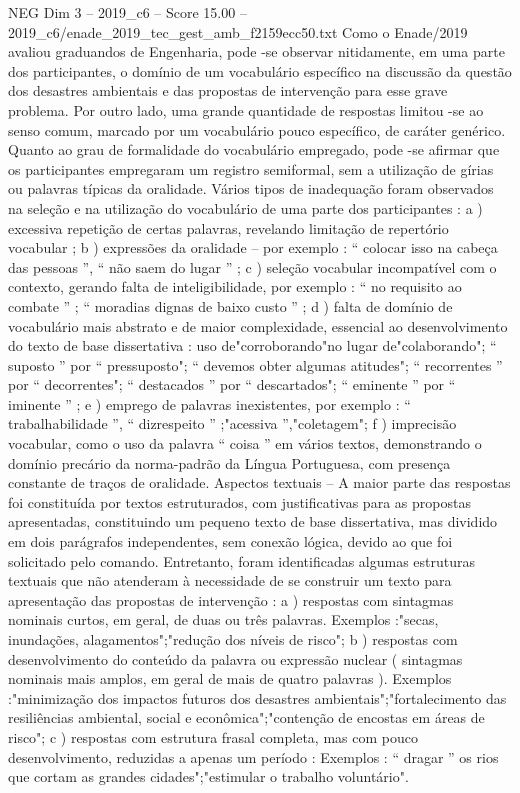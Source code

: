 \begin{textsample}{NEG Dim 3 – 2019\_c6 – Score 15.00 – 2019\_c6/enade\_2019\_tec\_gest\_amb\_f2159ecc50.txt}
Como o Enade/2019 avaliou graduandos de Engenharia, pode -se observar nitidamente, em uma parte dos participantes, o domínio de um vocabulário específico na discussão da questão dos desastres ambientais e das propostas de intervenção para esse grave problema.
Por outro lado, uma grande quantidade de respostas limitou -se ao senso comum, marcado por um vocabulário pouco específico, de caráter genérico.
Quanto ao grau de formalidade do vocabulário empregado, pode -se afirmar que os participantes empregaram um registro semiformal, sem a utilização de gírias ou palavras típicas da oralidade.
Vários tipos de inadequação foram observados na seleção e na utilização do vocabulário de uma parte dos participantes : a ) excessiva repetição de certas palavras, revelando limitação de repertório vocabular ; b ) expressões da oralidade – por exemplo : “ colocar isso na cabeça das pessoas ”, “ não saem do lugar ” ; c ) seleção vocabular incompatível com o contexto, gerando falta de inteligibilidade, por exemplo : “ no requisito ao combate ” ; “ moradias dignas de baixo custo ” ; d ) falta de domínio de vocabulário mais abstrato e de maior complexidade, essencial ao desenvolvimento do texto de base dissertativa : uso de"corroborando"no lugar de"colaborando"; “ suposto ” por “ pressuposto"; “ devemos obter algumas atitudes"; “ recorrentes ” por “ decorrentes"; “ destacados ” por “ descartados"; “ eminente ” por “ iminente ” ; e ) emprego de palavras inexistentes, por exemplo : “ trabalhabilidade ”, “ dizrespeito ” ;"acessiva ”,"coletagem"; f ) imprecisão vocabular, como o uso da palavra “ coisa ” em vários textos, demonstrando o domínio precário da norma-padrão da Língua Portuguesa, com presença constante de traços de oralidade.
Aspectos textuais – A maior parte das respostas foi constituída por textos estruturados, com justificativas para as propostas apresentadas, constituindo um pequeno texto de base dissertativa, mas dividido em dois parágrafos independentes, sem conexão lógica, devido ao que foi solicitado pelo comando.
Entretanto, foram identificadas algumas estruturas textuais que não atenderam à necessidade de se construir um texto para apresentação das propostas de intervenção : a ) respostas com sintagmas nominais curtos, em geral, de duas ou três palavras.
Exemplos :"secas, inundações, alagamentos";"redução dos níveis de risco"; b ) respostas com desenvolvimento do conteúdo da palavra ou expressão nuclear ( sintagmas nominais mais amplos, em geral de mais de quatro palavras ).
Exemplos :"minimização dos impactos futuros dos desastres ambientais";"fortalecimento das resiliências ambiental, social e econômica";"contenção de encostas em áreas de risco"; c ) respostas com estrutura frasal completa, mas com pouco desenvolvimento, reduzidas a apenas um período : Exemplos : “ dragar ” os rios que cortam as grandes cidades";"estimular o trabalho voluntário".

\end{textsample}
